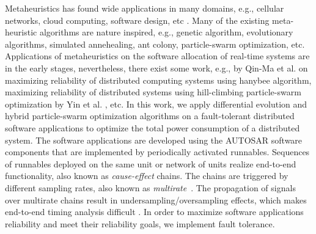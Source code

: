 Metaheuristics has found wide applications in many domains, e.g.,  cellular networks, cloud computing, software design, etc \cite{2006HandbookMetaheuristics}. Many of the existing meta-heuristic algorithms are nature inspired, e.g., genetic algorithm, evolutionary algorithms, simulated annehealing, ant colony, particle-swarm optimization, etc. Applications of metaheuristics on the software allocation of real-time systems are in the early stages, nevertheless, there exist some work, e.g., by Qin-Ma et al. \cite{kartik1997task} on maximizing reliability of distributed computing systems using hanybee algorithm, maximizing reliability of distributed systems using hill-climbing particle-swarm optimization by Yin et al. \cite{yin2007task}, etc. In this work, we apply differential evolution and hybrid particle-swarm optimization algorithms on a fault-tolerant distributed software applications to optimize the total power consumption of a distributed system. The software applications are developed using the AUTOSAR software components that are implemented by periodically activated runnables. Sequences of runnables deployed on the same unit or network of units realize end-to-end functionality, also known as \textit{cause-effect} chains. The chains are triggered by different sampling rates, also known as  \textit{multirate}~\cite{Vinet2010APolynomials}. The propagation of signals over multirate chains result in undersampling/oversampling effects, which makes end-to-end timing analysis difficult \cite{mubeen2013support}. In order to maximize software applications reliability and meet their reliability goals, we implement fault tolerance. 

